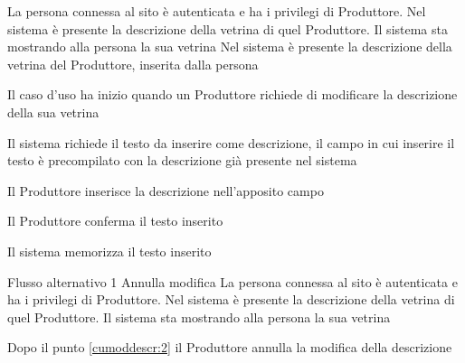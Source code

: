 
{}
{La persona connessa al sito è autenticata e ha i privilegi di Produttore. Nel sistema è presente la descrizione della vetrina di quel Produttore. Il sistema sta mostrando alla persona la sua vetrina}
{Nel sistema è presente la descrizione della vetrina del Produttore, inserita dalla persona}
{\begin{enumCU}
		\item Il caso d'uso ha inizio quando un Produttore richiede di modificare la descrizione della sua vetrina
		\item Il sistema richiede il testo da inserire come descrizione, il campo in cui inserire il testo è precompilato con la descrizione già presente nel sistema 
		\item Il Produttore inserisce la descrizione nell'apposito campo\label{cumoddescr:2}
		\item Il Produttore conferma il testo inserito
		\item Il sistema memorizza il testo inserito
	\end{enumCU}}
%
{Flusso alternativo 1}%
{Annulla modifica}%
{La persona connessa al sito è autenticata e ha i privilegi di Produttore. Nel sistema è presente la descrizione della vetrina di quel Produttore. Il sistema sta mostrando alla persona la sua vetrina}%
{\postNulle}%
{\begin{enumCU}
		\item Dopo il punto \ref{cumoddescr:2} il Produttore annulla la modifica della descrizione
	\end{enumCU}}%


